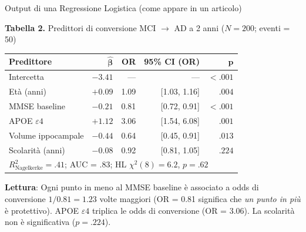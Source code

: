 \documentclass[
  ignorenonframetext,
]{beamer}
\begin{document}
\begin{frame}{Output di una Regressione Logistica (come appare in un
articolo)}
\label{output-di-una-regressione-logistica-come-appare-in-un-articolo}
\vspace{-0.2em}
\begin{center}
\small
\textbf{Tabella 2.} Predittori di conversione MCI $\to$ AD a 2 anni ($N = 200$; eventi = 50)
\vspace{0.4em}

\begin{tabular}{lrrrr}
\toprule
\textbf{Predittore} & $\boldsymbol{\hat{\beta}}$ & \textbf{OR} & \textbf{95\% CI (OR)} & $\boldsymbol{p}$ \\
\midrule
Intercetta            & $-3.41$ & ---  & ---              & $<.001$ \\
\rowcolor{mblue!8}
Età (anni)            & $+0.09$ & 1.09 & [1.03, 1.16]     & $.004$  \\
MMSE baseline         & $-0.21$ & 0.81 & [0.72, 0.91]     & $<.001$ \\
\rowcolor{mblue!8}
APOE $\varepsilon4$   & $+1.12$ & 3.06 & [1.54, 6.08]     & $.001$  \\
Volume ippocampale    & $-0.44$ & 0.64 & [0.45, 0.91]     & $.013$  \\
Scolarità (anni)      & $-0.08$ & 0.92 & [0.81, 1.05]     & $.224$  \\
\midrule
\multicolumn{5}{l}{\footnotesize $R^2_{\text{Nagelkerke}} = .41$;\; AUC = .83;\; HL $\chi^2(8) = 6.2$, $p = .62$} \\
\bottomrule
\end{tabular}
\end{center}
\vspace{0.2em}
\footnotesize
\textbf{Lettura}: Ogni punto in meno al MMSE baseline è associato a odds di conversione $1/0.81 = 1.23$ volte maggiori (OR = 0.81 significa che \emph{un punto in più} è protettivo). APOE $\varepsilon4$ triplica le odds di conversione (OR = 3.06). La scolarità non è significativa ($p = .224$).
\end{frame}
\end{document}
